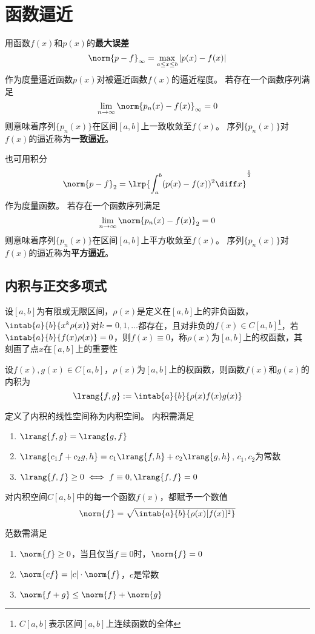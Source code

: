
\section{函数逼近}
用函数$f(x)$和$p(x)$的\textbf{最大误差}
\[\norm{p-f}_\infty=\max_{a\leq x\leq b}|p(x)-f(x)|\]
作为度量逼近函数$p(x)$对被逼近函数$f(x)$的逼近程度。
若存在一个函数序列满足
\[\lim_{n\to\infty}\norm{p_n(x)-f(x)}_\infty=0\]
则意味着序列$\{p_n(x)\}$在区间$[a,b]$上一致收敛至$f(x)$。
序列$\{p_n(x)\}$对$f(x)$的逼近称为\textbf{一致逼近}。

也可用积分
\[\norm{p-f}_2=\lrp{\int_a^b(p(x)-f(x))^2\diff x}^{\frac{1}{2}}\]
作为度量函数。
若存在一个函数序列满足
\[\lim_{n\to\infty}\norm{p_n(x)-f(x)}_2=0\]
则意味着序列$\{p_n(x)\}$在区间$[a,b]$上平方收敛至$f(x)$。
序列$\{p_n(x)\}$对$f(x)$的逼近称为\textbf{平方逼近}。

\subsection{内积与正交多项式}
\begin{definition}[权函数]
    设$[a,b]$为有限或无限区间，$\rho(x)$是定义在$[a,b]$上的非负函数，$\intab{a}{b}{x^k\rho(x)}$对$k=0,1,\ldots$都存在，且对非负的$f(x)\in C[a,b]$\footnote{$C[a,b]$表示区间$[a,b]$上连续函数的全体}，若$\intab{a}{b}{f(x)\rho(x)}=0$，则$f(x)\equiv 0$，称$\rho(x)$为$[a,b]$上的权函数，其刻画了点$x$在$[a,b]$上的重要性
\end{definition}
\begin{definition}[内积]
    设$f(x),g(x)\in C[a,b]$，$\rho(x)$为$[a,b]$上的权函数，则函数$f(x)$和$g(x)$的内积为
    \[\lrang{f,g}:=\intab{a}{b}{\rho(x)f(x)g(x)}\]
\end{definition}
定义了内积的线性空间称为内积空间。
内积需满足
\begin{enumerate}
    \item $\lrang{f,g}=\lrang{g,f}$
    \item $\lrang{c_1f+c_2g,h}=c_1\lrang{f,h}+c_2\lrang{g,h}$, $c_1,c_2$为常数
    \item $\lrang{f,f}\geq 0\iff f\equiv 0,\lrang{f,f}=0$
\end{enumerate}

\begin{definition}[范数]
对内积空间$C[a,b]$中的每一个函数$f(x)$，都赋予一个数值
\[\norm{f}=\sqrt{\intab{a}{b}{\rho(x)[f(x)]^2}}\]
\end{definition}
范数需满足
\begin{enumerate}
    \item $\norm{f}\geq 0$，当且仅当$f\equiv 0$时，$\norm{f}=0$
    \item $\norm{cf}=|c|\cdot\norm{f}$，$c$是常数
    \item $\norm{f+g}\leq\norm{f}+\norm{g}$
\end{enumerate}


